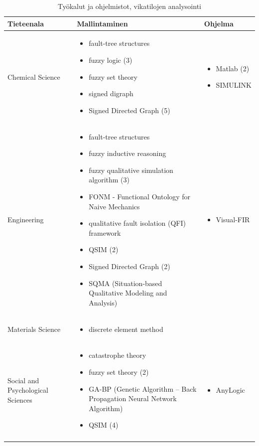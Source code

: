 \documentclass[utf8]{gradu3}
\begin{document}
\begin{longtable}[h]{|p{4cm}|p{6cm}|p{5cm}|}
    \hline
    \textbf{Tieteenala}    &    \textbf{Mallintaminen} & \textbf{Ohjelma}\\
    \hline
    Chemical Science & \begin{itemize}
        \item fault-tree structures
        \item fuzzy logic (3)
        \item fuzzy set theory
        \item signed digraph
        \item Signed Directed Graph (5)
    \end{itemize} & 
    \begin{itemize}
        \item Matlab (2)
        \item SIMULINK
    \end{itemize}
    \\
    \hline
    Engineering & \begin{itemize}
        \item fault-tree structures
        \item fuzzy inductive reasoning
        \item fuzzy qualitative simulation algorithm (3)
        \item FONM - Functional Ontology for Naive Mechanics 
        \item qualitative fault isolation (QFI) framework
        \item QSIM (2)
        \item Signed Directed Graph (2)
        \item SQMA (Situation-based Qualitative Modeling and Analysis)
    \end{itemize} & 
    \begin{itemize}
        \item Visual-FIR
    \end{itemize}
    \\
    \hline
    Materials Science & \begin{itemize}
        \item discrete element method
    \end{itemize} &
    
    \\
    \hline
    Social and Psychological Sciences & \begin{itemize}
        \item catastrophe theory
        \item fuzzy set theory (2)
        \item GA-BP (Genetic Algorithm – Back Propagation Neural Network Algorithm)
        \item QSIM (4)
    \end{itemize} & 
    \begin{itemize}
        \item AnyLogic
    \end{itemize}
    \\   
    \hline
    \caption{Työkalut ja ohjelmistot, vikatilojen analysointi}
    \label{table:mallintaminen 2.}
\end{longtable}
\end{document}
